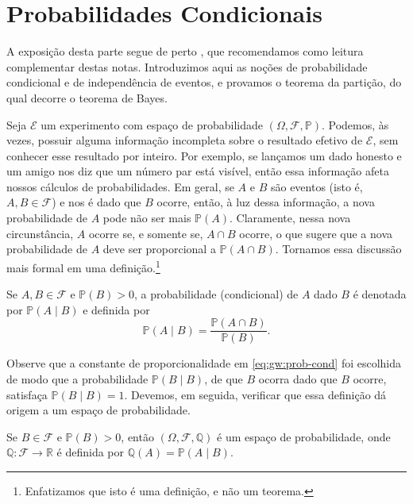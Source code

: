 \section{Probabilidades Condicionais}

A exposição desta parte segue de perto \cite{GrimmettWelsh2014}, que
recomendamos como leitura complementar destas notas. Introduzimos aqui as
noções de probabilidade condicional e de independência de eventos, e provamos
o teorema da partição, do qual decorre o teorema de Bayes.

Seja \(\mathcal{E}\) um experimento com espaço de probabilidade \((\Omega,
\mathcal{F}, \mathbb{P})\). Podemos, às vezes, possuir alguma informação
incompleta sobre o resultado efetivo de \(\mathcal{E}\), sem conhecer esse
resultado por inteiro. Por exemplo, se lançamos um dado honesto e um amigo nos
diz que um número par está visível, então essa informação afeta nossos cálculos
de probabilidades. Em geral, se \(A\) e \(B\) são eventos (isto é, \(A, B \in
\mathcal{F}\)) e nos é dado que \(B\) ocorre, então, à luz dessa informação, a
nova probabilidade de \(A\) pode não ser mais \(\mathbb{P}(A)\). Claramente,
nessa nova circunstância, \(A\) ocorre se, e somente se, \(A \cap B\) ocorre, o
que sugere que a nova probabilidade de \(A\) deve ser proporcional a
\(\mathbb{P}(A \cap B)\). Tornamos essa discussão mais formal em uma
definição.\footnote{Enfatizamos que isto é uma definição, e não um teorema.}

\begin{definition}\label{gw:def:prob-cond}
  Se \(A, B \in \mathcal{F}\) e \(\mathbb{P}(B) > 0\), a probabilidade
  (condicional) de \(A\) dado \(B\) é denotada por \(\mathbb{P}(A \mid B)\) e
  definida por
  \[
    \mathbb{P}(A \mid B) = \frac{\mathbb{P}(A \cap B)}{\mathbb{P}(B)}.
    \label{eq:gw:prob-cond}
  \]
\end{definition}

Observe que a constante de proporcionalidade em \eqref{eq:gw:prob-cond} foi
escolhida de modo que a probabilidade \(\mathbb{P}(B \mid B)\), de que \(B\)
ocorra dado que \(B\) ocorre, satisfaça \(\mathbb{P}(B \mid B) = 1\). Devemos,
em seguida, verificar que essa definição dá origem a um espaço de
probabilidade.

\begin{theorem}\label{gw:teo:cond-espaco-prob}
  Se \(B \in \mathcal{F}\) e \(\mathbb{P}(B) > 0\), então \((\Omega,
  \mathcal{F}, \mathbb{Q})\) é um espaço de probabilidade, onde \(\mathbb{Q}:
  \mathcal{F} \to \mathbb{R}\) é definida por \(\mathbb{Q}(A) = \mathbb{P}(A
  \mid B)\).
\end{theorem}

